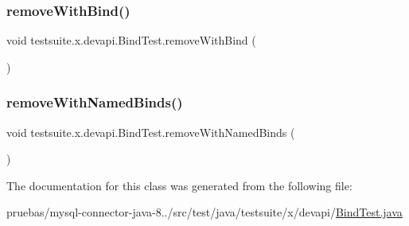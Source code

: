 \subsubsection{\texorpdfstring{remove\+With\+Bind()}{removeWithBind()}}
{\footnotesize\ttfamily void testsuite.\+x.\+devapi.\+Bind\+Test.\+remove\+With\+Bind (\begin{DoxyParamCaption}{ }\end{DoxyParamCaption})}

\mbox{\label{classtestsuite_1_1x_1_1devapi_1_1_bind_test_a4642a4e47c40c09a56e2cc9b1ae00189}} 
\subsubsection{\texorpdfstring{remove\+With\+Named\+Binds()}{removeWithNamedBinds()}}
{\footnotesize\ttfamily void testsuite.\+x.\+devapi.\+Bind\+Test.\+remove\+With\+Named\+Binds (\begin{DoxyParamCaption}{ }\end{DoxyParamCaption})}



The documentation for this class was generated from the following file\+:\begin{DoxyCompactItemize}
\item 
pruebas/mysql-\/connector-\/java-\/8../src/test/java/testsuite/x/devapi/\mbox{\hyperlink{_bind_test_8java}{Bind\+Test.\+java}}\end{DoxyCompactItemize}
